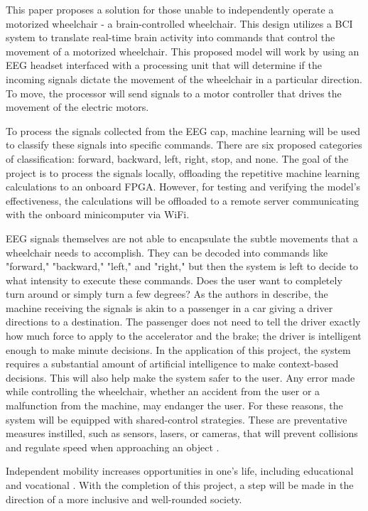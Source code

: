 \documentclass[conference]{IEEEtran}
\begin{document}
    This paper proposes a solution for those unable to independently operate a motorized wheelchair - a brain-controlled wheelchair. This design utilizes a BCI system to translate real-time brain activity into commands that control the movement of a motorized wheelchair. This proposed model will work by using an EEG headset interfaced with a processing unit that will determine if the incoming signals dictate the movement of the wheelchair in a particular direction. To move, the processor will send signals to a motor controller that drives the movement of the electric motors. 
    
    To process the signals collected from the EEG cap, machine learning will be used to classify these signals into specific commands. There are six proposed categories of classification: forward, backward, left, right, stop, and none. The goal of the project is to process the signals locally, offloading the repetitive machine learning calculations to an onboard FPGA. However, for testing and verifying the model's effectiveness, the calculations will be offloaded to a remote server communicating with the onboard minicomputer via WiFi. 

    EEG signals themselves are not able to encapsulate the subtle movements that a wheelchair needs to accomplish. They can be decoded into commands like "forward," "backward," "left," and "right," but then the system is left to decide to what intensity to execute these commands. Does the user want to completely turn around or simply turn a few degrees? As the authors in \cite{learning_to_control} describe, the machine receiving the signals is akin to a passenger in a car giving a driver directions to a destination. The passenger does not need to tell the driver exactly how much force to apply to the accelerator and the brake; the driver is intelligent enough to make minute decisions. In the application of this project, the system requires a substantial amount of artificial intelligence to make context-based decisions. This will also help make the system safer to the user. Any error made while controlling the wheelchair, whether an accident from the user or a malfunction from the machine, may endanger the user. For these reasons, the system will be equipped with shared-control strategies. These are preventative measures instilled, such as sensors, lasers, or cameras, that will prevent collisions and regulate speed when approaching an object \cite{toward_brain_computer}. 
    
    Independent mobility increases opportunities in one's life, including educational and vocational \cite{how_many_people}. With the completion of this project, a step will be made in the direction of a more inclusive and well-rounded society.
\end{document}
